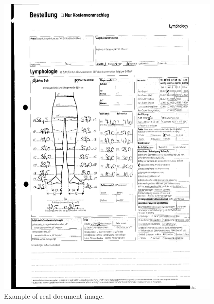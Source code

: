 \begin{figure}[H]
        \vspace*{2cm}
        \begin{center}
	    \includegraphics[scale=0.43]{images/RealImage.png}
	    \caption[Example of real document image.]{Example of real document image.}
	    \label{fig:RealImage}
	    \end{center}
\end{figure}

